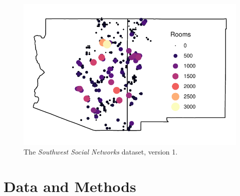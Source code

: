 \documentclass[10pt]{iopart}
\begin{document}

\begin{figure}[!ht]
\centering
\includegraphics[width=.9\linewidth]{figures/site_distribution.pdf}
\caption{The \emph{Southwest Social Networks} dataset, version 1.} 
\label{fig:network-plot}
\end{figure}

\section*{Data and Methods}
\end{document}
